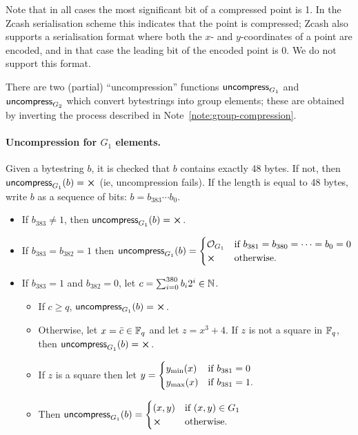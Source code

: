 Note that in all cases the most significant bit of a compressed point is 1.  In
the Zcash serialisation scheme this indicates that the point is compressed;
Zcash also supports a serialisation format where both the $x$- and
$y$-coordinates of a point are encoded, and in that case the leading bit of the
encoded point is 0.  We do not support this format.

\label{note:group-uncompression}
There are two (partial) ``uncompression'' functions $\mathsf{uncompress}_{G_1}$ and
$\mathsf{uncompress}_{G_2}$ which convert bytestrings into group elements; these are
obtained by inverting the process described in
Note~\ref{note:group-compression}.

\paragraph{Uncompression for $G_1$ elements.}  Given a bytestring $b$, it is checked that
$b$ contains exactly 48 bytes.  If not, then $\uncompress_{G_1}(b) = \errorX$ (ie,
uncompression fails).  If the length is equal to 48 bytes, write $b$ as a
sequence of bits: $b = b_{383} \cdots b_0$.
\begin{itemize}
\item If $b_{383} \neq 1$, then $\uncompress_{G_1}(b) = \errorX$.
\item If $b_{383} = b_{382} = 1$ then
$\uncompress_{G_1}(b) =
\begin{cases}
\mathcal{O}_{G_1} & \text{if $b_{381} = b_{380} = \cdots = b_0 = 0$}\\
\errorX & \text{otherwise}.
\end{cases}$
\item If $b_{383}=1$ and $b_{382}=0$, let $c=\sum_{i=0}^{380}b_i2^i \in \mathbb{N}$.
\begin{itemize}
\item If $c \geq q$, $\uncompress_{G_1}(b) = \errorX$.
\item Otherwise, let $x = \bar{c} \in \mathbb{F}_q$ and let $z = x^3+4$. If $z$ is not a
square in $\mathbb{F}_q$, then $\uncompress_{G_1}(b) = \errorX$.
\item If $z$ is a square then let
$y=\begin{cases}
y_{\text{min}}(x) & \text{if $b_{381}=0$}\\
y_{\text{max}}(x) & \text{if $b_{381}=1$}.
\end{cases}$
\item Then $\uncompress_{G_1}(b) = \begin{cases}
(x,y) & \text{if $(x,y) \in G_1$}\\
\errorX & \text{otherwise}.
\end{cases}$
\end{itemize}
\end{itemize}


